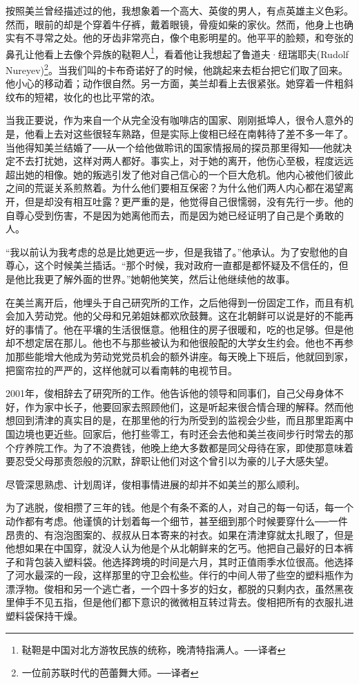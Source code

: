 按照美兰曾经描述过的他，我想象着一个高大、英俊的男人，有点英雄主义色彩。然而，眼前的却是个穿着牛仔裤，戴着眼镜，骨瘦如柴的家伙。然而，他身上也确实有不寻常之处。他的牙齿非常亮白，像个电影明星的。他平平的脸颊，和夸张的鼻孔让他看上去像个异族的鞑靼人\footnote{鞑靼是中国对北方游牧民族的统称，晚清特指满人。──译者}，看着他让我想起了鲁道夫·纽瑞耶夫(Rudolf Nureyev)\footnote{一位前苏联时代的芭蕾舞大师。──译者}。当我们叫的卡布奇诺好了的时候，他跳起来去柜台把它们取了回来。他小心的移动着；动作很自然。另一方面，美兰却看上去很紧张。她穿着一件粗斜纹布的短裙，妆化的也比平常的浓。

当我正要说，作为来自一个从完全没有咖啡店的国家、刚刚抵埠人，很令人意外的是，他看上去对这些很轻车熟路，但是实际上俊相已经在南韩待了差不多一年了。当他得知美兰结婚了──从一个给他做聆讯的国家情报局的探员那里得知──他就决定不去打扰她，这样对两人都好。事实上，对于她的离开，他伤心至极，程度远远超出她的相像。她的叛逃引发了他对自己信心的一个巨大危机。他内心被他们彼此之间的荒诞关系煎熬着。为什么他们要相互保密？为什么他们两人内心都在渴望离开，但是却没有相互吐露？更严重的是，他觉得自己很懦弱，没有先行一步。他的自尊心受到伤害，不是因为她离他而去，而是因为她已经证明了自己是个勇敢的人。

“我以前认为我考虑的总是比她更远一步，但是我错了。”他承认。为了安慰他的自尊心，这个时候美兰插话。“那个时候，我对政府一直都是都怀疑及不信任的，但是他比我更了解外面的世界。”她朝他笑笑，然后让他继续他的故事。

在美兰离开后，他埋头于自己研究所的工作，之后他得到一份固定工作，而且有机会加入劳动党。他的父母和兄弟姐妹都欢欣鼓舞。这在北朝鲜可以说是好的不能再好的事情了。他在平壤的生活很惬意。他租住的房子很暖和，吃的也足够。但是他却不想定居在那儿。他也不与那些被认为和他很般配的大学女生约会。他也不再参加那些能增大他成为劳动党党员机会的额外讲座。每天晚上下班后，他就回到家，把窗帘拉的严严的，这样他就可以看南韩的电视节目。

2001年，俊相辞去了研究所的工作。他告诉他的领导和同事们，自己父母身体不好，作为家中长子，他要回家去照顾他们，这是听起来很合情合理的解释。然而他想回到清津的真实目的是，在那里他的行为所受到的监视会少些，而且那里距离中国边境也更近些。回家后，他打些零工，有时还会去他和美兰夜间步行时常去的那个疗养院工作。为了不浪费钱，他晚上绝大多数都是同父母待在家，即使那意味着要忍受父母那责怨般的沉默，辞职让他们对这个曾引以为豪的儿子大感失望。

尽管深思熟虑、计划周详，俊相事情进展的却并不如美兰的那么顺利。

为了逃脱，俊相攒了三年的钱。他是个有条不紊的人，对自己的每一句话，每一个动作都有考虑。他谨慎的计划着每一个细节，甚至细到那个时候要穿什么──一件昂贵的、有泡泡图案的、叔叔从日本寄来的衬衣。如果在清津穿就太扎眼了，但是他想如果在中国穿，就没人认为他是个从北朝鲜来的乞丐。他把自己最好的日本裤子和背包装入塑料袋。他选择跨境的时间是六月，其时正值雨季水位很高。他选择了河水最深的一段，这样那里的守卫会松些。伴行的中间人带了些空的塑料瓶作为漂浮物。俊相和另一个逃亡者，一个四十多岁的妇女，都脱的只剩内衣，虽然黑夜里伸手不见五指，但是他们都下意识的微微相互转过背去。俊相把所有的衣服扎进塑料袋保持干燥。

